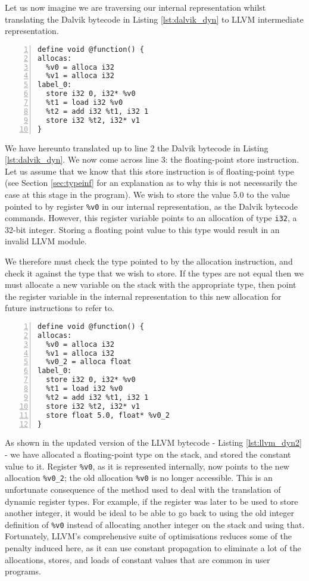 Let us now imagine we are traversing our internal representation whilst translating the Dalvik bytecode in Listing \ref{lst:dalvik_dyn} to LLVM intermediate representation.

\begin{lstlisting}[frame=single, numbers=left, numberstyle=\tiny, caption={LLVM IR for Listing \ref{lst:dalvik_dyn}}, label=lst:llvm_dyn] 
define void @function() {
allocas:
  %v0 = alloca i32
  %v1 = alloca i32
label_0:
  store i32 0, i32* %v0
  %t1 = load i32 %v0
  %t2 = add i32 %t1, i32 1
  store i32 %t2, i32* v1
}
\end{lstlisting}

We have hereunto translated up to line 2 the Dalvik bytecode in Listing \ref{lst:dalvik_dyn}. We now come across line 3: the floating-point store instruction. Let us assume that we know that this store instruction is of floating-point type (see Section \ref{sec:typeinf} for an explanation as to why this is not necessarily the case at this stage in the program). We wish to store the value 5.0 to the value pointed to by register \verb|%v0| in our internal representation, as the Dalvik bytecode commands. However, this register variable points to an allocation of type \verb|i32|, a 32-bit integer. Storing a floating point value to this type would result in an invalid LLVM module.

We therefore must check the type pointed to by the allocation instruction, and check it against the type that we wish to store. If the types are not equal then we must allocate a new variable on the stack with the appropriate type, then point the register variable in the internal representation to this new allocation for future instructions to refer to.

\begin{lstlisting}[frame=single, numbers=left, numberstyle=\tiny, caption={LLVM IR for Listing \ref{lst:dalvik_dyn} (cont.)}, label=lst:llvm_dyn2]
define void @function() {
allocas:
  %v0 = alloca i32
  %v1 = alloca i32
  %v0_2 = alloca float
label_0:
  store i32 0, i32* %v0
  %t1 = load i32 %v0
  %t2 = add i32 %t1, i32 1
  store i32 %t2, i32* v1
  store float 5.0, float* %v0_2
}
\end{lstlisting}

As shown in the updated version of the LLVM bytecode - Listing \ref{lst:llvm_dyn2} - we have allocated a floating-point type on the stack, and stored the constant value to it. Register \verb|%v0|, as it is represented internally, now points to the new allocation \verb|%v0_2|; the old allocation \verb|%v0| is no longer accessible. This is an unfortunate consequence of the method used to deal with the translation of dynamic register types. For example, if the register was later to be used to store another integer, it would be ideal to be able to go back to using the old integer definition of \verb|%v0| instead of allocating another integer on the stack and using that. Fortunately, LLVM's comprehensive suite of optimisations reduces some of the penalty induced here, as it can use constant propagation to eliminate a lot of the allocations, stores, and loads of constant values that are common in user programs.
